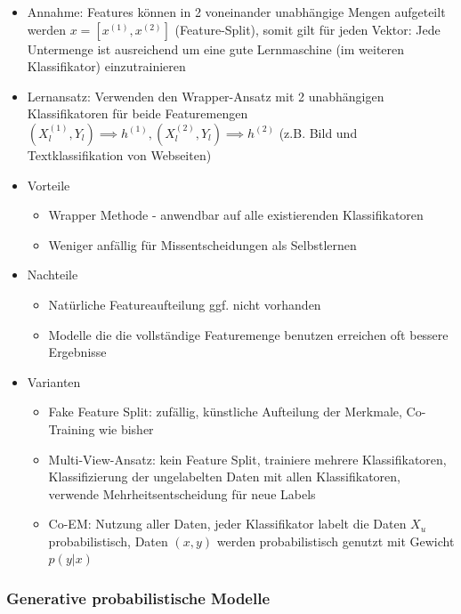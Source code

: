 \documentclass[paper=a4, fontsize=11pt]{scrartcl} %
\numberwithin{equation}{section} %
\numberwithin{figure}{section} %
\numberwithin{table}{section} %
\begin{document}
\begin{itemize}
\item Annahme: Features können in 2 voneinander unabhängige Mengen aufgeteilt werden $x = [x^{(1)}, x^{(2)}]$ (Feature-Split), somit gilt für jeden Vektor: Jede Untermenge ist ausreichend um eine gute Lernmaschine (im weiteren Klassifikator) einzutrainieren
\item Lernansatz: Verwenden den Wrapper-Ansatz mit 2 unabhängigen Klassifikatoren für beide Featuremengen $(X_l^{(1)}, Y_l) \implies h^{(1)}, (X_l^{(2)}, Y_l) \implies h^{(2)}$ (z.B. Bild und Textklassifikation von Webseiten)
\item Vorteile
\begin{itemize}
\item Wrapper Methode - anwendbar auf alle existierenden Klassifikatoren
\item Weniger anfällig für Missentscheidungen als Selbstlernen
\end{itemize}
\item Nachteile
\begin{itemize}
\item Natürliche Featureaufteilung ggf. nicht vorhanden
\item Modelle die die vollständige Featuremenge benutzen erreichen oft bessere Ergebnisse
\end{itemize}
\item Varianten
\begin{itemize}
\item Fake Feature Split: zufällig, künstliche Aufteilung der Merkmale, Co-Training wie bisher
\item Multi-View-Ansatz: kein Feature Split, trainiere mehrere Klassifikatoren, Klassifizierung der ungelabelten Daten mit allen Klassifikatoren, verwende Mehrheitsentscheidung für neue Labels
\item Co-EM: Nutzung aller Daten, jeder Klassifikator labelt die Daten $X_u$ probabilistisch, Daten $(x,y)$ werden probabilistisch genutzt mit Gewicht $p(y|x)$
\end{itemize}
\end{itemize}

\subsubsection{Generative probabilistische Modelle}
\end{document}
